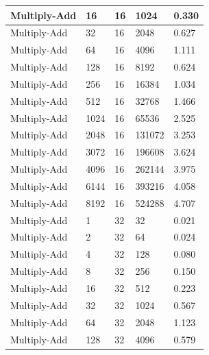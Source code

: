 \documentclass{article}
\begin{document}
\begin{longtable}{|l|l|l|l|l|}
Multiply-Add       & 16   & 16          & 1024              & 0.330             \\ \hline
Multiply-Add       & 32   & 16          & 2048              & 0.627             \\ \hline
Multiply-Add       & 64   & 16          & 4096              & 1.111             \\ \hline
Multiply-Add       & 128  & 16          & 8192              & 0.624             \\ \hline
Multiply-Add       & 256  & 16          & 16384             & 1.034             \\ \hline
Multiply-Add       & 512  & 16          & 32768             & 1.466             \\ \hline
Multiply-Add       & 1024 & 16          & 65536             & 2.525             \\ \hline
Multiply-Add       & 2048 & 16          & 131072            & 3.253             \\ \hline
Multiply-Add       & 3072 & 16          & 196608            & 3.624             \\ \hline
Multiply-Add       & 4096 & 16          & 262144            & 3.975             \\ \hline
Multiply-Add       & 6144 & 16          & 393216            & 4.058             \\ \hline
Multiply-Add       & 8192 & 16          & 524288            & 4.707             \\ \hline
Multiply-Add       & 1    & 32          & 32                & 0.021             \\ \hline
Multiply-Add       & 2    & 32          & 64                & 0.024             \\ \hline
Multiply-Add       & 4    & 32          & 128               & 0.080             \\ \hline
Multiply-Add       & 8    & 32          & 256               & 0.150             \\ \hline
Multiply-Add       & 16   & 32          & 512               & 0.223             \\ \hline
Multiply-Add       & 32   & 32          & 1024              & 0.567             \\ \hline
Multiply-Add       & 64   & 32          & 2048              & 1.123             \\ \hline
Multiply-Add       & 128  & 32          & 4096              & 0.579             \\ \hline

\end{longtable}
\end{document}
